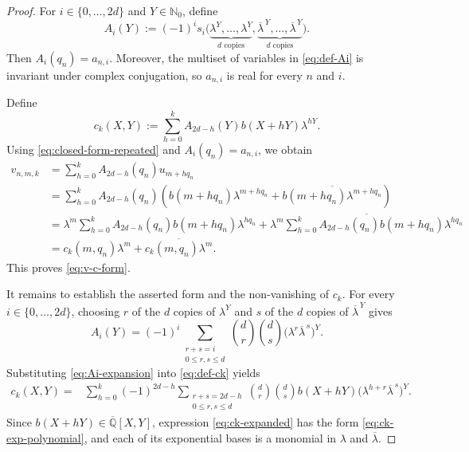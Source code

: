 \documentclass[10pt,a4paper]{amsart}
\begin{document}
\begin{proof}
For $i\in\{0,\ldots,2d\}$ and $Y\in\mathbb{N}_0$, define
\begin{equation}
    A_i(Y)
    :=(-1)^i
    s_i\bigl(
        \underbrace{\lambda^Y,\ldots,\lambda^Y}_{d\text{ copies}},
        \underbrace{\overline{\lambda}^{\,Y},\ldots,
                    \overline{\lambda}^{\,Y}}_{d\text{ copies}}
    \bigr).
    \label{eq:def-Ai}
\end{equation}
Then $A_i(q_n)=a_{n,i}$. Moreover, the multiset of variables in
\eqref{eq:def-Ai} is invariant under complex conjugation, so
 $a_{n,i}$ is real for every $n$ and $i$.

Define
\begin{equation}
    c_k(X,Y)
    :=\sum_{h=0}^{k}
       A_{2d-h}(Y)b(X+hY)\lambda^{hY}.
    \label{eq:def-ck}
\end{equation}
Using \eqref{eq:closed-form-repeated} and
$A_i(q_n)=a_{n,i}$, we obtain
\begin{align*}
    v_{n,m,k}
    &=\sum_{h=0}^{k}A_{2d-h}(q_n)u_{m+hq_n}\\
    &=\sum_{h=0}^{k}A_{2d-h}(q_n)
      \left(
          b(m+hq_n)\lambda^{m+hq_n}
          +\overline{b(m+hq_n)\lambda^{m+hq_n}}
      \right)\\
    &=\lambda^m
      \sum_{h=0}^{k}A_{2d-h}(q_n)
          b(m+hq_n)\lambda^{hq_n}
      +\overline{
          \lambda^m
          \sum_{h=0}^{k}A_{2d-h}(q_n)
              b(m+hq_n)\lambda^{hq_n}
       }\\
    &=c_k(m,q_n)\lambda^m
      +\overline{c_k(m,q_n)\lambda^m}.
\end{align*}
This proves \eqref{eq:v-c-form}.

It remains to establish the asserted form and the non-vanishing of $c_k$.
For every $i\in\{0,\ldots,2d\}$, choosing $r$ of the $d$ copies of
$\lambda^Y$ and $s$ of the $d$ copies of
$\overline{\lambda}^{\,Y}$ gives
\begin{equation}
    A_i(Y)
    =(-1)^i
      \sum_{\substack{r+s=i\\0\leq r,s\leq d}}
      \binom{d}{r}\binom{d}{s}
      \bigl(\lambda^r\overline{\lambda}^{\,s}\bigr)^Y.
    \label{eq:Ai-expansion}
\end{equation}
Substituting \eqref{eq:Ai-expansion} into \eqref{eq:def-ck} yields
\begin{equation}
\begin{split}
    c_k(X,Y)
    ={}&\sum_{h=0}^{k}(-1)^{2d-h}
       \sum_{\substack{r+s=2d-h\\0\leq r,s\leq d}}
       \binom{d}{r}\binom{d}{s}
       b(X+hY)
       \bigl(\lambda^{h+r}\overline{\lambda}^{\,s}\bigr)^Y.
\end{split}
    \label{eq:ck-expanded}
\end{equation}
Since $b(X+hY)\in\overline{\mathbb{Q}}[X,Y]$, expression
\eqref{eq:ck-expanded} has the form \eqref{eq:ck-exp-polynomial}, and each
of its exponential bases is a monomial in $\lambda$ and
$\overline{\lambda}$.


\end{proof}
\end{document}
